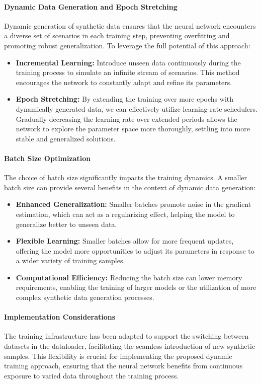 \paragraph{Dynamic Data Generation and Epoch Stretching}
Dynamic generation of synthetic data ensures that the neural network encounters a diverse set of scenarios in each training step, preventing overfitting and promoting robust generalization. To leverage the full potential of this approach:
\begin{itemize}
    \item \textbf{Incremental Learning:} Introduce unseen data continuously during the training process to simulate an infinite stream of scenarios. This method encourages the network to constantly adapt and refine its parameters.
    \item \textbf{Epoch Stretching:} By extending the training over more epochs with dynamically generated data, we can effectively utilize learning rate schedulers. Gradually decreasing the learning rate over extended periods allows the network to explore the parameter space more thoroughly, settling into more stable and generalized solutions.
\end{itemize}

\paragraph{Batch Size Optimization}
The choice of batch size significantly impacts the training dynamics. A smaller batch size can provide several benefits in the context of dynamic data generation:
\begin{itemize}
    \item \textbf{Enhanced Generalization:} Smaller batches promote noise in the gradient estimation, which can act as a regularizing effect, helping the model to generalize better to unseen data.
    \item \textbf{Flexible Learning:} Smaller batches allow for more frequent updates, offering the model more opportunities to adjust its parameters in response to a wider variety of training samples.
    \item \textbf{Computational Efficiency:} Reducing the batch size can lower memory requirements, enabling the training of larger models or the utilization of more complex synthetic data generation processes.
\end{itemize}

\paragraph{Implementation Considerations}
The training infrastructure has been adapted to support the switching between datasets in the dataloader, facilitating the seamless introduction of new synthetic samples. This flexibility is crucial for implementing the proposed dynamic training approach, ensuring that the neural network benefits from continuous exposure to varied data throughout the training process.

